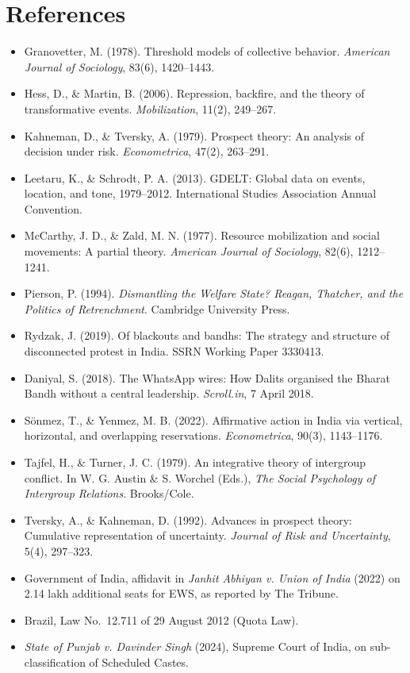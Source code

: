 \documentclass[11pt,a4paper]{article}
\begin{document}
\section*{References}
\begin{small}
\begin{itemize}[leftmargin=12pt,label={}]
\item Granovetter, M. (1978). Threshold models of collective behavior. \emph{American Journal of Sociology}, 83(6), 1420--1443.
\item Hess, D., \& Martin, B. (2006). Repression, backfire, and the theory of transformative events. \emph{Mobilization}, 11(2), 249--267.
\item Kahneman, D., \& Tversky, A. (1979). Prospect theory: An analysis of decision under risk. \emph{Econometrica}, 47(2), 263--291.
\item Leetaru, K., \& Schrodt, P. A. (2013). GDELT: Global data on events, location, and tone, 1979--2012. International Studies Association Annual Convention.
\item McCarthy, J. D., \& Zald, M. N. (1977). Resource mobilization and social movements: A partial theory. \emph{American Journal of Sociology}, 82(6), 1212--1241.
\item Pierson, P. (1994). \emph{Dismantling the Welfare State? Reagan, Thatcher, and the Politics of Retrenchment}. Cambridge University Press.
\item Rydzak, J. (2019). Of blackouts and bandhs: The strategy and structure of disconnected protest in India. SSRN Working Paper 3330413.
\item Daniyal, S. (2018). The WhatsApp wires: How Dalits organised the Bharat Bandh without a central leadership. \emph{Scroll.in}, 7 April 2018.
\item Sönmez, T., \& Yenmez, M. B. (2022). Affirmative action in India via vertical, horizontal, and overlapping reservations. \emph{Econometrica}, 90(3), 1143--1176.
\item Tajfel, H., \& Turner, J. C. (1979). An integrative theory of intergroup conflict. In W. G. Austin \& S. Worchel (Eds.), \emph{The Social Psychology of Intergroup Relations}. Brooks/Cole.
\item Tversky, A., \& Kahneman, D. (1992). Advances in prospect theory: Cumulative representation of uncertainty. \emph{Journal of Risk and Uncertainty}, 5(4), 297--323.
\item Government of India, affidavit in \emph{Janhit Abhiyan v. Union of India} (2022) on 2.14 lakh additional seats for EWS, as reported by The Tribune.
\item Brazil, Law No.\ 12.711 of 29 August 2012 (Quota Law).
\item \emph{State of Punjab v. Davinder Singh} (2024), Supreme Court of India, on sub-classification of Scheduled Castes.
\end{itemize}
\end{small}
\end{document}
